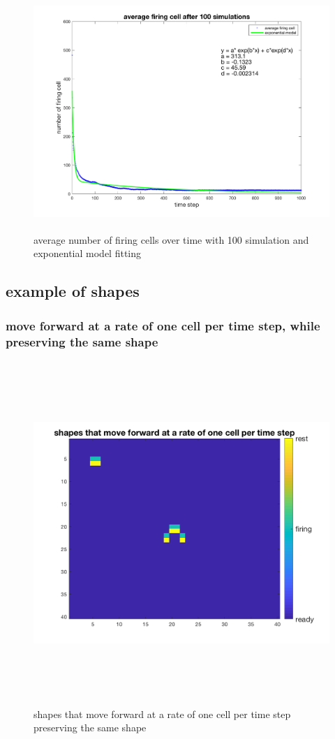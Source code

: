 \documentclass[12pt]{article}
\begin{document}
\begin{figure}[H] %
\centering
\includegraphics[width = 12 cm, height = 9cm]{sim_model.png}
\caption{average number of firing cells over time with 100 simulation and exponential model fitting}
\label{fig:sim_model}
\end{figure}




\subsection{example of shapes}

\subsubsection{move forward at a rate of one cell per time step, while preserving the same shape}
\begin{figure}[H] %
\centering
\includegraphics[width = 16 cm, height = 13cm]{task2_1.png}
\caption{shapes that move forward at a rate of one cell per time step preserving the same shape}
\label{fig:task2_1}
\end{figure}
\end{document}

